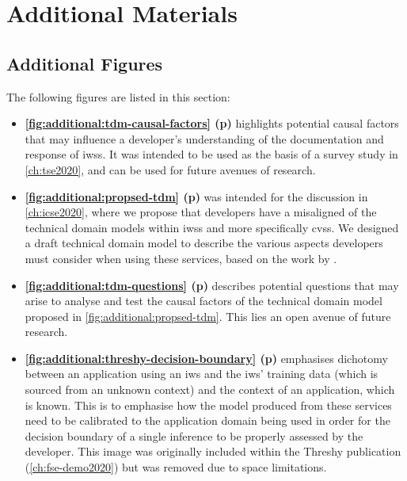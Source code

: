 \chapter{Additional Materials}
\label{ch:additional-materials}

\cleardoublepage



\clearpage

\section{Additional Figures}

The following figures are listed in this section:

\begin{itemize}
\item \textbf{\cref{fig:additional:tdm-causal-factors} (p\pageref{fig:additional:tdm-causal-factors})}
  highlights potential causal factors that may influence a developer's understanding of the documentation and response of \glspl{iws}. It was intended to be used as the basis of a survey study in \cref{ch:tse2020}, and can be used for future avenues of research.
\item \textbf{\cref{fig:additional:propsed-tdm} (p\pageref{fig:additional:propsed-tdm})}
  was intended for the discussion in \cref{ch:icse2020}, where we propose that developers have a misaligned of the technical domain models within \glspl{iws} and more specifically \glspl{cvs}. We designed a draft technical domain model to describe the various aspects developers must consider when using these services, based on the work by \citet{Barnett:2018Kx}. 
\item \textbf{\cref{fig:additional:tdm-questions} (p\pageref{fig:additional:tdm-questions})}
  describes potential questions that may arise to analyse and test the causal factors of the technical domain model proposed in \cref{fig:additional:propsed-tdm}. This lies an open avenue of future research.
\item \textbf{\cref{fig:additional:threshy-decision-boundary} (p\pageref{fig:additional:threshy-decision-boundary})}
  emphasises dichotomy between an application using an \gls{iws} and the \gls{iws}' training data (which is sourced from an unknown context) and the context of an application, which is known. This is to emphasise how the model produced from these services need to be calibrated to the application domain being used in order for the decision boundary of a single inference to be properly assessed by the developer. This image was originally included within the Threshy publication (\cref{ch:fse-demo2020}) but was removed due to space limitations.

\end{itemize}
